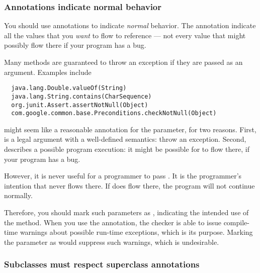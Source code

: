 \subsubsection{Annotations indicate normal behavior\label{annotate-normal-behavior}}

You should use annotations to indicate \emph{normal} behavior.  The
annotation indicate all the values that you \emph{want} to flow to
reference --- not every value that might possibly flow there if your
program has a bug.

Many methods are guaranteed to throw an exception if they are passed 
as an argument.  Examples include

\begin{Verbatim}
  java.lang.Double.valueOf(String)
  java.lang.String.contains(CharSequence)
  org.junit.Assert.assertNotNull(Object)
  com.google.common.base.Preconditions.checkNotNull(Object)
\end{Verbatim}

 might seem like a reasonable annotation for the parameter,
for two reasons.  First,  is a legal argument with a
well-defined semantics:  throw an exception.  Second, 
describes a possible program execution:  it might be possible for
 to flow there, if your program has a bug.


However, it is never useful for a programmer to pass .  It is
the programmer's intention that  never flows there.  If
 does flow there, the program will not continue normally.

Therefore, you should mark such parameters as , indicating
the intended use of the method.  When you use the 
annotation, the checker is able to issue compile-time warnings about
possible run-time exceptions, which is its purpose.  Marking the parameter
as  would suppress such warnings, which is undesirable.



\subsubsection{Subclasses must respect superclass annotations\label{annotations-are-a-contract}}

